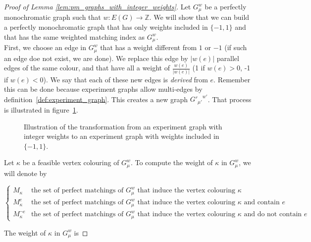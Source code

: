 \begin{proof}[Proof of Lemma \ref{lem:pm_graphs_with_integer_weights}]
    Let $G_\mu^w$ be a perfectly monochromatic graph such that $w: E(G) \rightarrow \mathbb{Z}$.
    We will show that we can build a perfectly monochromatic graph that has only weights included in $\{-1, 1\}$ and that has the same weighted matching index as $G_\mu^w$. \\

    First, we choose an edge in $G_\mu^w$ that has a weight different from $1$ or $-1$ (if such an edge doe not exist, we are done).
    We replace this edge by $|w(e)|$ parallel edges of the same colour, and that have all a weight of $\frac{w(e)}{|w(e)|}$ (1 if $w(e) > 0$, -1 if $w(e) < 0$).
    We say that each of these new edges is \textit{derived} from $e$.
    Remember this can be done because experiment graphs allow multi-edges by definition~\ref{def:experiment_graph}.
    This creates a new graph ${G'_{\mu'}}^{w'}$.
    That process is illustrated in figure~\ref{fig:demo_integers}.\\

    \begin{figure}[H]
        \caption{Illustration of the transformation from an experiment graph with integer weights to an experiment graph with weights included in $\{-1, 1\}$.}
        \label{fig:demo_integers}
    \end{figure}

    Let $\kappa$ be a feasible vertex colouring of $G_\mu^w$.
    To compute the weight of $\kappa$ in $G_\mu^w$, we will denote by
    \begin{center}
        $\left\{
            \begin{array}{ll}
                M_{\kappa}          & \mbox{the set of perfect matchings of } G_\mu^w \mbox{ that induce the vertex colouring } \kappa \\
                M_{\kappa}^e        & \mbox{the set of perfect matchings of } G_\mu^w \mbox{ that induce the vertex colouring } \kappa \mbox{ and contain } e \\
                M_{\kappa}^{\neg e} & \mbox{the set of perfect matchings of } G_\mu^w \mbox{ that induce the vertex colouring } \kappa \mbox{ and do not contain } e
            \end{array}
        \right.$
    \end{center}

    The weight of $\kappa$ in $G_\mu^w$ is


\end{proof}
